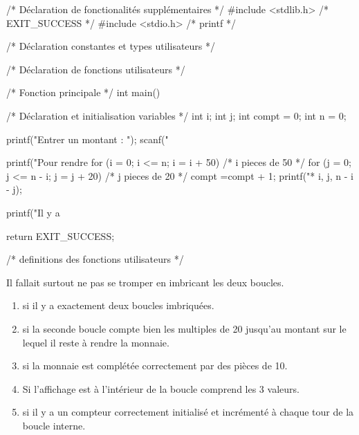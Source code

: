 \begin{correction}
\begin{small}
\begin{listing}{1}
/* Déclaration de fonctionalités supplémentaires */
#include <stdlib.h> /* EXIT_SUCCESS */
#include <stdio.h> /* printf */

/* Déclaration constantes et types utilisateurs */

/* Déclaration de fonctions utilisateurs */

/* Fonction principale */
int main()
{
    /* Déclaration et initialisation variables */
    int i;
    int j;
    int compt = 0;
    int n = 0;

    printf("Entrer un montant : ");
    scanf("%

    printf("Pour rendre %
    for (i = 0; i <= n; i = i + 50) /* i pieces de 50 */
    {
        for (j = 0; j <= n - i; j = j + 20) /* j pieces de 20 */
        {
            compt =compt + 1;
            printf("* %
                        i, j, n - i - j);
        }
    }

    printf("Il y a %
  
   return EXIT_SUCCESS;
}

/* definitions des fonctions utilisateurs */
\end{listing}
\end{small}
\end{correction}


\begin{baremeenv}
Il fallait surtout ne pas se tromper en imbricant les deux boucles.
  \begin{enumerate}[ (a)]
  \item {}  si il y a exactement deux boucles imbriquées.
  \item {} si la seconde boucle compte bien les multiples de 20
    jusqu'au montant sur le lequel il reste à rendre la monnaie.
\item {} si la monnaie est complétée correctement par des
  pièces de 10.
    \item {} Si l'affichage est à l'intérieur de la boucle
      comprend les 3 valeurs.
\item {} si il y a un compteur correctement initialisé et
  incrémenté à chaque tour de la boucle interne.
\end{enumerate}
\end{baremeenv}

